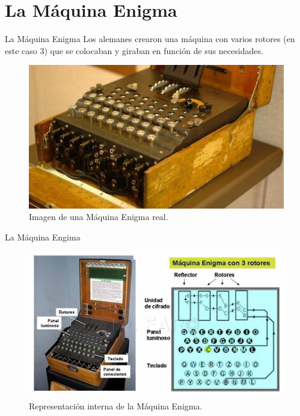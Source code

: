 \documentclass[aspectratio=169]{beamer}
\begin{document}
\section{La Máquina Enigma}
\begin{frame}{La Máquina Enigma}
\centering
    Los alemanes crearon una máquina con varios rotores (en este caso 3) que se colocaban y giraban en función de sus necesidades.
    \begin{figure}

           \includegraphics[width=0.5\linewidth]{pic/Máquina Enigma.png}
           \caption{Imagen de una Máquina Enigma real.}
           \label{fig:maquina-enigma}
    \end{figure}   

\end{frame}

\begin{frame}{La Máquina Engima}

\begin{figure}
    \centering
    \includegraphics[width=0.75\linewidth]{Máquina Engima 2.png}
    \caption{Representación interna de la Máquina Enigma.}
    \label{fig:enter-label}
\end{figure}

\end{frame}
\end{document}
